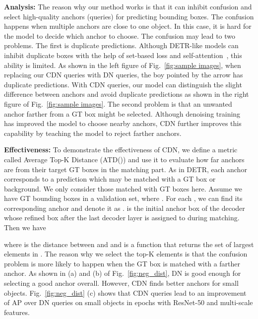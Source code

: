 \documentclass[runningheads]{llncs}
\begin{document}
\noindent\textbf{Analysis:} The reason why our method works is that it can inhibit confusion and select high-quality anchors (queries) for predicting bounding boxes. The confusion happens when multiple anchors are close to one object. In this case, it is hard for the model to decide which anchor to choose. The confusion may lead to two problems. The first is duplicate predictions. Although DETR-like models can inhibit duplicate boxes with the help of set-based loss and self-attention~\cite{carion2020end}, this ability is limited. As shown in the left figure of Fig.~\ref{fig:sample images}, when replacing our CDN queries with DN queries, the boy pointed by the arrow has  duplicate predictions. With CDN queries, our model can distinguish the slight difference between anchors and avoid duplicate predictions as shown in the right figure of Fig.~\ref{fig:sample images}. The second problem is that an unwanted anchor farther from a GT box might be selected. Although denoising training~\cite{li2022dn} has improved the model to choose nearby anchors, CDN further improves this capability by teaching the model to reject farther anchors.

\noindent\textbf{Effectiveness:} To demonstrate the effectiveness of CDN, we define a metric called Average Top-K Distance (ATD()) and use it to evaluate how far anchors are from their target GT boxes in the matching part.
As in DETR, each anchor corresponds to a prediction which may be matched with a GT box or background. We only consider those matched with GT boxes here. Assume we have  GT bounding boxes  in a validation set, where . For each , we can find its corresponding anchor and denote it as .  is the initial anchor box of the decoder whose refined box after the last decoder layer is assigned to  during matching. Then we have 

where  is the  distance between  and  and  is a function that returns the set of  largest elements in . The reason why we select the top-K elements is that the confusion problem is more likely to happen when the GT box is matched with a farther anchor. As shown in (a) and (b) of Fig.~\ref{fig:neg_dist}, DN is good enough for selecting a good anchor overall. However, CDN finds better anchors for small objects. Fig.~\ref{fig:neg_dist} (c) shows that CDN queries lead to an improvement of  AP over DN queries on small objects in  epochs with ResNet-50 and multi-scale features.
\end{document}
